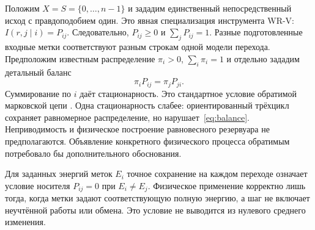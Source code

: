 \section{}
\label{sec:markov}
{Положим $X=S=\{0,\ldots,n-1\}$ и зададим единственный непосредственный исход с правдоподобием один. Это явная специализация инструмента WR-V: $I(r,j\mid i)=P_{ij}$. Следовательно, $P_{ij}\geq0$ и $\sum_jP_{ij}=1$. Разные подготовленные входные метки соответствуют разным строкам одной модели перехода. Предположим известным распределение $\pi_i>0$, $\sum_i\pi_i=1$ и отдельно зададим детальный баланс}
\begin{equation}\label{eq:balance}
 \pi_iP_{ij}=\pi_jP_{ji}.
\end{equation}
{Суммирование по $i$ даёт стационарность. Это стандартное условие обратимой марковской цепи \cite[Section 1.6, Proposition 1.20]{LP}. Одна стационарность слабее: ориентированный трёхцикл сохраняет равномерное распределение, но нарушает~\eqref{eq:balance}. Неприводимость и физическое построение равновесного резервуара не предполагаются. Объявление конкретного физического процесса обратимым потребовало бы дополнительного обоснования.}

{Для заданных энергий меток $E_i$ точное сохранение на каждом переходе означает условие носителя $P_{ij}=0$ при $E_i\ne E_j$. Физическое применение корректно лишь тогда, когда метки задают соответствующую полную энергию, а шаг не включает неучтённой работы или обмена. Это условие не выводится из нулевого среднего изменения.}

